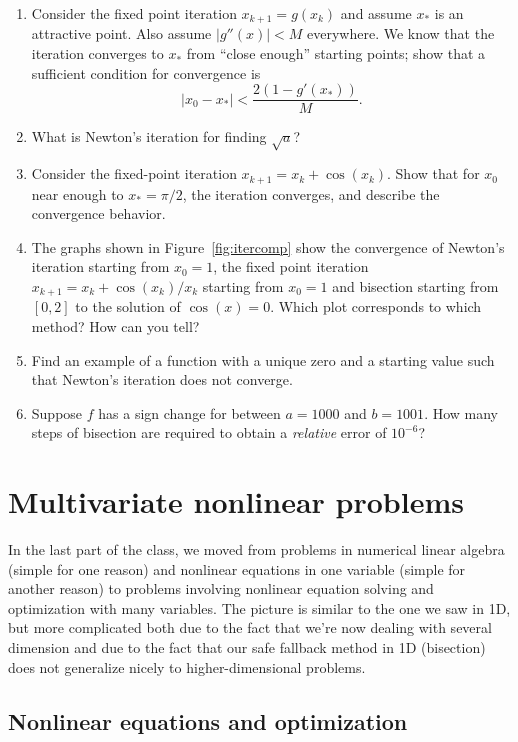 \documentclass[12pt, leqno]{article}
\begin{document}
\begin{enumerate}
\item
  Consider the fixed point iteration $x_{k+1} = g(x_k)$ and assume
  $x_*$ is an attractive point.  Also assume $|g''(x)| < M$
  everywhere.  We know that the iteration converges to $x_*$ from
  ``close enough'' starting points; show that a sufficient condition
  for convergence is
  \[
    |x_0-x_*| < \frac{2(1-g'(x_*))}{M}.
  \]
\item
  What is Newton's iteration for finding $\sqrt{a}$?
\item
  Consider the fixed-point iteration $x_{k+1} = x_k + \cos(x_k)$.
  Show that for $x_0$ near enough to $x_* = \pi/2$, the iteration
  converges, and describe the convergence behavior.
\item
  The graphs shown in Figure~\ref{fig:itercomp} show the convergence
  of Newton's iteration starting from $x_0 = 1$, the fixed point iteration
  $x_{k+1} = x_k + \cos(x_k)/x_k$ starting from $x_0 = 1$
  and bisection starting from $[0,2]$ to the solution of
  $\cos(x) = 0$.  Which plot corresponds to which method?  How can you
  tell?
\item
  Find an example of a function with a unique zero and a starting
  value such that Newton's iteration does not converge.
\item
  Suppose $f$ has a sign change for between $a = 1000$ and $b = 1001$.
  How many steps of bisection are required to obtain a {\em relative}
  error of $10^{-6}$?
\end{enumerate}

\newpage
\section{Multivariate nonlinear problems}

In the last part of the class, we moved from problems in numerical
linear algebra (simple for one reason) and nonlinear equations in one
variable (simple for another reason) to problems involving nonlinear
equation solving and optimization with many variables.  The picture is
similar to the one we saw in 1D, but more complicated both due to the
fact that we're now dealing with several dimension and due to the fact
that our safe fallback method in 1D (bisection) does not generalize
nicely to higher-dimensional problems.

\subsection{Nonlinear equations and optimization}
\end{document}

